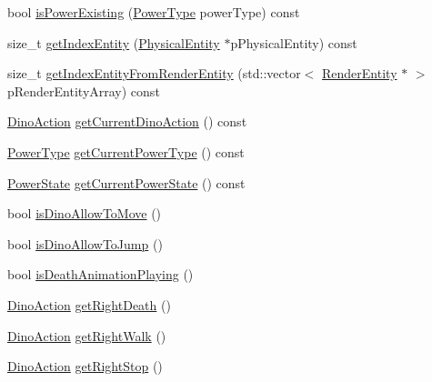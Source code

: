 \begin{DoxyCompactItemize}
\item 
bool \hyperlink{class_symp_1_1_entity_manager_a49fa79a733f9a075807cacd69b5b8e75}{is\-Power\-Existing} (\hyperlink{namespace_symp_a81b2b15da470e4ace7de6835ebe0f8ba}{Power\-Type} power\-Type) const 
\item 
size\-\_\-t \hyperlink{class_symp_1_1_entity_manager_a9009e9467ce9240176f37041531f1f53}{get\-Index\-Entity} (\hyperlink{class_symp_1_1_physical_entity}{Physical\-Entity} $\ast$p\-Physical\-Entity) const 
\item 
size\-\_\-t \hyperlink{class_symp_1_1_entity_manager_a120b298f2703eef7973e123a67c9bcdd}{get\-Index\-Entity\-From\-Render\-Entity} (std\-::vector$<$ \hyperlink{class_symp_1_1_render_entity}{Render\-Entity} $\ast$ $>$ p\-Render\-Entity\-Array) const 
\item 
\hyperlink{namespace_symp_a303925db810fa122d017c4001bfa5e88}{Dino\-Action} \hyperlink{class_symp_1_1_entity_manager_af68a927c11f97d6bedb3e4f1d24b7113}{get\-Current\-Dino\-Action} () const 
\item 
\hyperlink{namespace_symp_a81b2b15da470e4ace7de6835ebe0f8ba}{Power\-Type} \hyperlink{class_symp_1_1_entity_manager_a3d3c399d4194f5c08371b8fa182b11c9}{get\-Current\-Power\-Type} () const 
\item 
\hyperlink{namespace_symp_a7c4a93cb3761077f6b73ebce19c562c1}{Power\-State} \hyperlink{class_symp_1_1_entity_manager_a0649f2b3f065f7ffd9457b3401b78146}{get\-Current\-Power\-State} () const 
\item 
bool \hyperlink{class_symp_1_1_entity_manager_a78c7feee11012871c2e0bf11f9c7f9d3}{is\-Dino\-Allow\-To\-Move} ()
\item 
bool \hyperlink{class_symp_1_1_entity_manager_a530f46316832cbe3f39278a80b41a0de}{is\-Dino\-Allow\-To\-Jump} ()
\item 
bool \hyperlink{class_symp_1_1_entity_manager_a5b5a53c52b7f2133e74f910320ee3203}{is\-Death\-Animation\-Playing} ()
\item 
\hyperlink{namespace_symp_a303925db810fa122d017c4001bfa5e88}{Dino\-Action} \hyperlink{class_symp_1_1_entity_manager_a7c72832895e29e4eb5f77d6ab0fe58d2}{get\-Right\-Death} ()
\item 
\hyperlink{namespace_symp_a303925db810fa122d017c4001bfa5e88}{Dino\-Action} \hyperlink{class_symp_1_1_entity_manager_a3ce38be311a9d0712d3b8713eb5f76e8}{get\-Right\-Walk} ()
\item 
\hyperlink{namespace_symp_a303925db810fa122d017c4001bfa5e88}{Dino\-Action} \hyperlink{class_symp_1_1_entity_manager_a43d0eb59800de0b2422b5b0f95d2c08f}{get\-Right\-Stop} ()

\end{DoxyCompactItemize}

